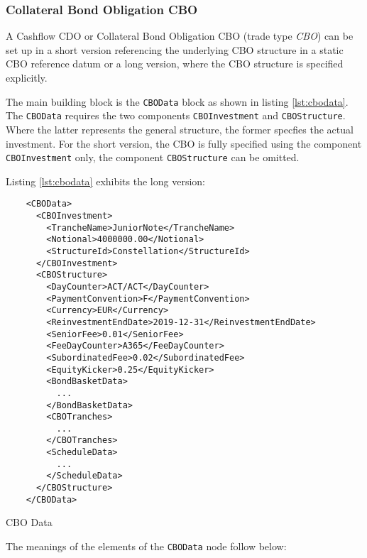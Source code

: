 \subsubsection{Collateral Bond Obligation CBO}
\label{ss:CBOData} 

A Cashflow CDO or Collateral Bond Obligation CBO (trade type \emph{CBO}) can be set up in a short version 
referencing the underlying CBO structure in a static CBO reference datum or a long version, where the CBO structure is specified explicitly.

The main building block is the {\tt CBOData} block as shown in listing 
\ref{lst:cbodata}. The {\tt CBOData} requires the two components {\tt CBOInvestment} and {\tt CBOStructure}. 
Where the latter represents the general structure, the former specfies the actual investment. 
For the short version, the CBO is fully specified using the component {\tt CBOInvestment} only, 
the component {\tt CBOStructure} can be omitted. 

Listing \ref{lst:cbodata} exhibits the long version: 

\begin{listing}[H]
\begin{verbatim}
    <CBOData>
      <CBOInvestment>
        <TrancheName>JuniorNote</TrancheName>
        <Notional>4000000.00</Notional>
        <StructureId>Constellation</StructureId>
      </CBOInvestment>
      <CBOStructure>
        <DayCounter>ACT/ACT</DayCounter>
        <PaymentConvention>F</PaymentConvention>
        <Currency>EUR</Currency>
        <ReinvestmentEndDate>2019-12-31</ReinvestmentEndDate>
        <SeniorFee>0.01</SeniorFee>
        <FeeDayCounter>A365</FeeDayCounter>
        <SubordinatedFee>0.02</SubordinatedFee>
        <EquityKicker>0.25</EquityKicker>
        <BondBasketData>
          ...
        </BondBasketData>
        <CBOTranches>
          ...
        </CBOTranches>
        <ScheduleData>
          ...
        </ScheduleData>
      </CBOStructure>
    </CBOData>
\end{verbatim}
\caption{CBO Data}
\label{lst:cbodata}
\end{listing}

The meanings of the elements of the {\tt CBOData} node follow below:

